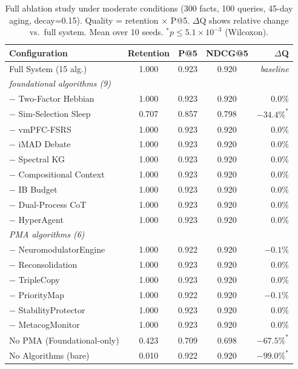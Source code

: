 \documentclass{article}
\begin{document}
\begin{table}[h]
    \caption{Full ablation study under moderate conditions (300 facts, 100 queries,
    45-day aging, decay=0.15). Quality = retention $\times$ P@5.
    $\Delta$Q shows relative change vs.\ full system.
    Mean over 10 seeds. $^\ast p \le 5.1\times 10^{-3}$ (Wilcoxon).}
    \label{tab:full-ablation}
    \centering
    \small
    \begin{tabular}{lcccr}
        \toprule
        Configuration & Retention & P@5 & NDCG@5 & $\Delta$Q \\
        \midrule
        Full System (15 alg.) & 1.000 & 0.923 & 0.920 & \emph{baseline} \\
        \midrule
        \multicolumn{5}{l}{\textit{foundational algorithms (9)}} \\
        $-$ Two-Factor Hebbian & 1.000 & 0.923 & 0.920 & $0.0\%$ \\
        $-$ Sim-Selection Sleep & 0.707 & 0.857 & 0.798 & $-34.4\%^\ast$ \\
        $-$ vmPFC-FSRS & 1.000 & 0.923 & 0.920 & $0.0\%$ \\
        $-$ iMAD Debate & 1.000 & 0.923 & 0.920 & $0.0\%$ \\
        $-$ Spectral KG & 1.000 & 0.923 & 0.920 & $0.0\%$ \\
        $-$ Compositional Context & 1.000 & 0.923 & 0.920 & $0.0\%$ \\
        $-$ IB Budget & 1.000 & 0.923 & 0.920 & $0.0\%$ \\
        $-$ Dual-Process CoT & 1.000 & 0.923 & 0.920 & $0.0\%$ \\
        $-$ HyperAgent & 1.000 & 0.923 & 0.920 & $0.0\%$ \\
        \midrule
        \multicolumn{5}{l}{\textit{PMA algorithms (6)}} \\
        $-$ NeuromodulatorEngine & 1.000 & 0.922 & 0.920 & $-0.1\%$ \\
        $-$ Reconsolidation & 1.000 & 0.923 & 0.920 & $0.0\%$ \\
        $-$ TripleCopy & 1.000 & 0.923 & 0.920 & $0.0\%$ \\
        $-$ PriorityMap & 1.000 & 0.922 & 0.920 & $-0.1\%$ \\
        $-$ StabilityProtector & 1.000 & 0.923 & 0.920 & $0.0\%$ \\
        $-$ MetacogMonitor & 1.000 & 0.923 & 0.920 & $0.0\%$ \\
        \midrule
        No PMA (Foundational-only) & 0.423 & 0.709 & 0.698 & $-67.5\%^\ast$ \\
        No Algorithms (bare) & 0.010 & 0.922 & 0.920 & $-99.0\%^\ast$ \\
        \bottomrule
    \end{tabular}
\end{table}
\end{document}
